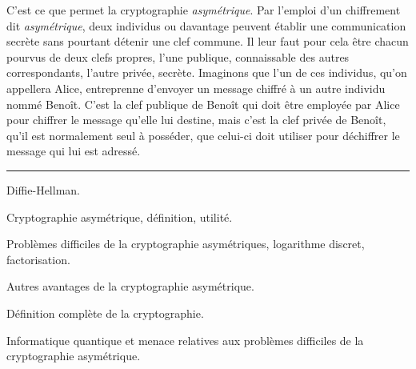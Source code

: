 C’est ce que permet la cryptographie {\it asymétrique}.
Par l’emploi d’un chiffrement dit {\it asymétrique\/}, deux individus ou davantage peuvent établir une communication secrète sans pourtant détenir une clef commune.
Il leur faut pour cela être chacun pourvus de deux clefs propres, l’une publique, connaissable des autres correspondants, l’autre privée, secrète. 
Imaginons que l’un de ces individus, qu’on appellera Alice, entreprenne d’envoyer un message chiffré à un autre individu nommé Benoît. C’est la clef publique de Benoît qui doit être employée par Alice pour chiffrer le message qu’elle lui destine, mais c’est la clef privée de Benoît, qu’il est normalement seul à posséder, que celui-ci doit utiliser pour déchiffrer le message qui lui est adressé.


\vskip2cm
\hrule
\vskip2cm
Diffie-Hellman.

Cryptographie asymétrique, définition, utilité.

Problèmes difficiles de la cryptographie asymétriques, logarithme discret, factorisation.

Autres avantages de la cryptographie asymétrique.

Définition complète de la cryptographie.

Informatique quantique et menace relatives aux problèmes difficiles de la cryptographie asymétrique.









